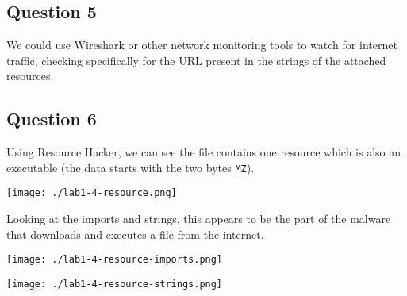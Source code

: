 \documentclass[11pt]{article}
\begin{document}
\subsection{Question 5}
\label{sec:org753f7a6}
We could use Wireshark or other network monitoring tools to watch for
internet traffic, checking specifically for the URL present in the
strings of the attached resources.
\subsection{Question 6}
\label{sec:org54f84bf}
Using Resource Hacker, we can see the file contains one resource which
is also an executable (the data starts with the two bytes \texttt{MZ}).

\begin{center}
\texttt{[image: ./lab1-4-resource.png]}
\end{center}

Looking at the imports and strings, this appears to be the part of the
malware that downloads and executes a file from the internet.

\begin{center}
\texttt{[image: ./lab1-4-resource-imports.png]}
\end{center}

\begin{center}
\texttt{[image: ./lab1-4-resource-strings.png]}
\end{center}
\end{document}
